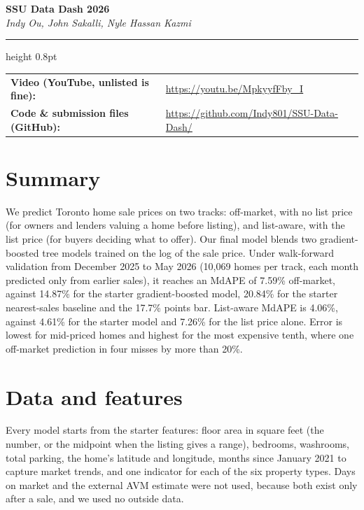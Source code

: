 \documentclass[11pt,a4paper]{article}
\begin{document}
\begin{center}
  {\LARGE\bfseries SSU Data Dash 2026}\\[6pt]
  {\itshape Indy Ou, John Sakalli, Nyle Hassan Kazmi}
\end{center}
\vspace{-4pt}
{\color{black}\hrule height 0.8pt}
\vspace{6pt}
{\small
\begin{tabularx}{\textwidth}{@{}p{}X@{}}
\textbf{Video (YouTube, unlisted is fine):} & \url{https://youtu.be/MpkyyfFby_I}\\[2pt]
\textbf{Code \& submission files (GitHub):} & \url{https://github.com/Indy801/SSU-Data-Dash/}\\
\end{tabularx}}

\section*{Summary}

We predict Toronto home sale prices on two tracks: off-market, with no list price (for owners
and lenders valuing a home before listing), and list-aware, with the list price (for buyers
deciding what to offer). Our final model blends two gradient-boosted tree models trained on the
log of the sale price. Under walk-forward validation from December 2025 to May 2026 (10,069
homes per track, each month predicted only from earlier sales), it reaches an MdAPE of 7.59\%
off-market, against 14.87\% for the starter gradient-boosted model, 20.84\% for the starter
nearest-sales baseline and the 17.7\% points bar. List-aware MdAPE is 4.06\%, against 4.61\% for
the starter model and 7.26\% for the list price alone. Error is lowest for mid-priced homes and
highest for the most expensive tenth, where one off-market prediction in four misses by more
than 20\%.

\section{Data and features}

Every model starts from the starter features: floor area in square feet (the number, or the
midpoint when the listing gives a range), bedrooms, washrooms, total parking, the home's
latitude and longitude, months since January 2021 to capture market trends, and one indicator
for each of the six property types. Days on market and the external AVM estimate were not
used, because both exist only after a sale, and we used no outside data.
\end{document}

